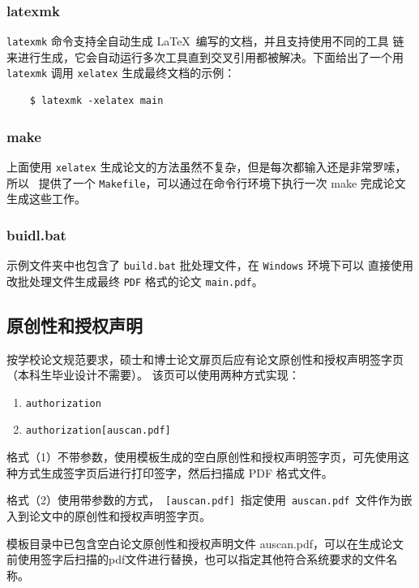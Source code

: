 \subsubsection{latexmk}

\texttt{latexmk} 命令支持全自动生成 \LaTeX\ 编写的文档，并且支持使用不同的工具
链来进行生成，它会自动运行多次工具直到交叉引用都被解决。下面给出了一个用
\texttt{latexmk} 调用 \texttt{xelatex} 生成最终文档的示例：

\begin{lstlisting}
    $ latexmk -xelatex main
\end{lstlisting}

\subsubsection{make}

上面使用 \texttt{xelatex} 生成论文的方法虽然不复杂，但是每次都输入还是非常罗嗦，所以 \heuthesis\
提供了一个 \texttt{Makefile}，可以通过在命令行环境下执行一次 make 完成论文生成这些工作。

\subsubsection{buidl.bat}

示例文件夹中也包含了 \texttt{build.bat} 批处理文件，在 \texttt{Windows} 环境下可以
直接使用改批处理文件生成最终 \texttt{PDF} 格式的论文 \texttt{main.pdf}。

\subsection{原创性和授权声明}

按学校论文规范要求，硕士和博士论文扉页后应有论文原创性和授权声明签字页（本科生毕业设计不需要）。
该页可以使用两种方式实现：

\begin{enumerate}
  \item[(1)] \texttt{\cs authorization}
  \item[(2)] \texttt{\cs authorization[auscan.pdf]}
\end{enumerate}

格式（1）不带参数，使用模板生成的空白原创性和授权声明签字页，可先使用这种方式生成签字页后进行打印签字，然后扫描成 PDF 格式文件。

格式（2）使用带参数的方式，~\texttt{[auscan.pdf]}~指定使用~\texttt{auscan.pdf}~文件作为嵌入到论文中的原创性和授权声明签字页。

模板目录中已包含空白论文原创性和授权声明文件 auscan.pdf，可以在生成论文前使用签字后扫描的pdf文件进行替换，也可以指定其他符合系统要求的文件名称。

